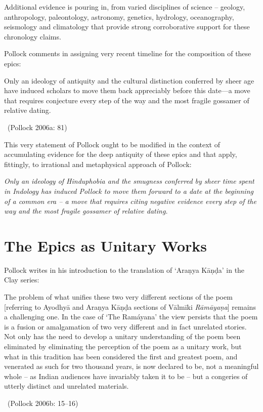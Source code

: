 Additional evidence is pouring in, from varied disciplines of science – geology, anthropology, paleontology, astronomy, genetics, hydrology, oceanography, seismology and climatology that provide strong corroborative support for these chronology claims.

Pollock comments in assigning very recent timeline for the composition of these epics:

\begin{myquote}
Only an ideology of antiquity and the cultural distinction conferred by sheer age have induced scholars to move them back appreciably before this date—a move that requires conjecture every step of the way and the most fragile gossamer of relative dating. 

~\hfill (Pollock 2006a: 81)
\end{myquote}

This very statement of Pollock ought to be modified in the context of accumulating evidence for the deep antiquity of these epics and that apply, fittingly, to irrational and metaphysical approach of Pollock:

\textit{Only an ideology of Hinduphobia and the smugness conferred by sheer time spent in Indology has induced Pollock to move them forward to a date at the beginning of a common era – a move that requires citing negative evidence every step of the way and the most fragile gossamer of relative dating.}


\section*{The Epics as Unitary Works}

Pollock writes in his introduction to the translation of ‘Araṇya Kāṇḍa’ in the Clay series:

\begin{myquote}
The problem of what unifies these two very different sections of the poem [referring to Ayodhyā and Araṇya Kāṇḍa sections of Vālmīki \textit{Rāmāyaṇa}] remains a challenging one. In the case of ‘The Ramáyana’ the view persists that the poem is a fusion or amalgamation of two very different and in fact unrelated stories. Not only has the need to develop a unitary understanding of the poem been eliminated by eliminating the perception of the poem as a unitary work, but what in this tradition has been considered the first and greatest poem, and venerated as such for two thousand years, is now declared to be, not a meaningful whole – as Indian audiences have invariably taken it to be – but a congeries of utterly distinct and unrelated materials. 

~\hfill (Pollock 2006b: 15–16)
\end{myquote}

